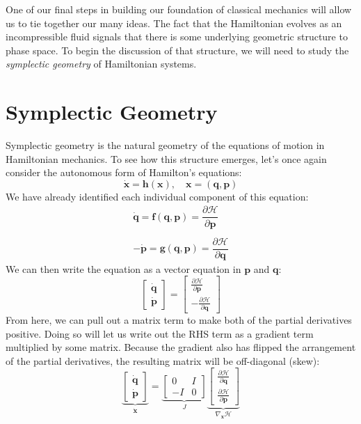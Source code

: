 One of our final steps in building our foundation of classical mechanics will allow us to tie together our many ideas. The fact that the \gls{Hamiltonian} evolves as an incompressible fluid signals that there is some underlying geometric structure to phase space. To begin the discussion of that structure, we will need to study the \textit{symplectic geometry} of \gls{Hamiltonian} systems.

 \section{Symplectic Geometry}

Symplectic geometry is the natural geometry of the equations of motion in \gls{Hamiltonian} mechanics. To see how this structure emerges, let's once again consider the autonomous form of Hamilton's equations:
$$\bm{\dot{x}}=\bm{h}(\bm{x}),\quad\bm{x}=(\bm{q,p})$$
 We have already identified each individual component of this equation:
\begin{gather}
\bm{\dot{q}}=\bm{f}(\bm{q},\bm{p})=\dfrac{\partial \mathcal{H}}{\partial \bm{p}}\\\\
-\bm{\dot{p}}=\bm{g}(\bm{q},\bm{p})=\dfrac{\partial \mathcal{H}}{\partial \bm{q}}
\end{gather}
We can then write the equation as a vector equation in $\bm{p}$ and $\bm{q}$:
$$\begin{bmatrix}
\bm{\dot{q}}\\\bm{\dot{p}}
\end{bmatrix}=\begin{bmatrix}
\frac{\partial \mathcal{H}}{\partial \bm{p}}\\[3pt]
-\frac{\partial \mathcal{H}}{\partial \bm{q}}
\end{bmatrix}$$
From here, we can pull out a matrix term to make both of the partial derivatives positive. Doing so will let us write out the RHS term as a gradient term multiplied by some matrix. Because the gradient also has flipped the arrangement of the partial derivatives, the resulting matrix will be off-diagonal (skew):
$$\underbrace{\begin{bmatrix}
\bm{\dot{q}}\\\bm{\dot{p}}
\end{bmatrix}}_{\bm{\dot{x}}}=\underbrace{\begin{bmatrix}
    0&I\\-I&0
\end{bmatrix}}_J\underbrace{\begin{bmatrix}
\frac{\partial \mathcal{H}}{\partial \bm{q}}\\[3pt]
\frac{\partial \mathcal{H}}{\partial \bm{p}}
\end{bmatrix}}_{\nabla_{\bm{x}}\mathcal{H}}$$
